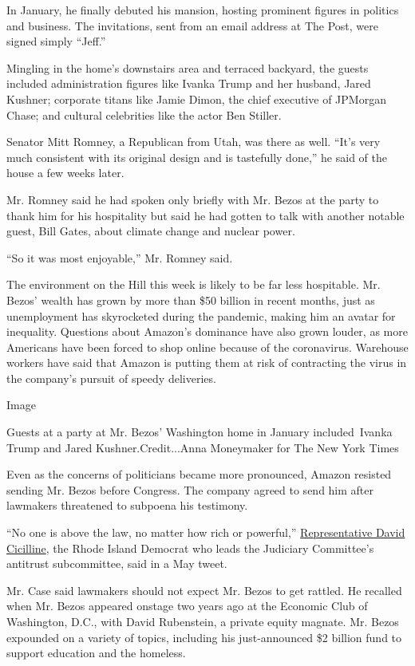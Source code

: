 In January, he finally debuted his mansion, hosting prominent figures in
politics and business. The invitations, sent from an email address at
The Post, were signed simply ``Jeff.''

Mingling in the home's downstairs area and terraced backyard, the guests
included administration figures like Ivanka Trump and her husband, Jared
Kushner; corporate titans like Jamie Dimon, the chief executive of
JPMorgan Chase; and cultural celebrities like the actor Ben Stiller.

Senator Mitt Romney, a Republican from Utah, was there as well. ``It's
very much consistent with its original design and is tastefully done,''
he said of the house a few weeks later.

Mr. Romney said he had spoken only briefly with Mr. Bezos at the party
to thank him for his hospitality but said he had gotten to talk with
another notable guest, Bill Gates, about climate change and nuclear
power.

``So it was most enjoyable,'' Mr. Romney said.

The environment on the Hill this week is likely to be far less
hospitable. Mr. Bezos' wealth has grown by more than \$50 billion in
recent months, just as unemployment has skyrocketed during the pandemic,
making him an avatar for inequality. Questions about Amazon's dominance
have also grown louder, as more Americans have been forced to shop
online because of the coronavirus. Warehouse workers have said that
Amazon is putting them at risk of contracting the virus in the company's
pursuit of speedy deliveries.

Image

Guests at a party at Mr. Bezos' Washington home in January
included~Ivanka Trump and Jared Kushner.Credit...Anna Moneymaker for The
New York Times

Even as the concerns of politicians became more pronounced, Amazon
resisted sending Mr. Bezos before Congress. The company agreed to send
him after lawmakers threatened to subpoena his testimony.

``No one is above the law, no matter how rich or powerful,''
\href{https://twitter.com/davidcicilline/status/1261432733982773251}{Representative
David Cicilline}, the Rhode Island Democrat who leads the Judiciary
Committee's antitrust subcommittee, said in a May tweet.

Mr. Case said lawmakers should not expect Mr. Bezos to get rattled. He
recalled when Mr. Bezos appeared onstage two years ago at the Economic
Club of Washington, D.C., with David Rubenstein, a private equity
magnate. Mr. Bezos expounded on a variety of topics, including his
just-announced \$2 billion fund to support education and the homeless.

